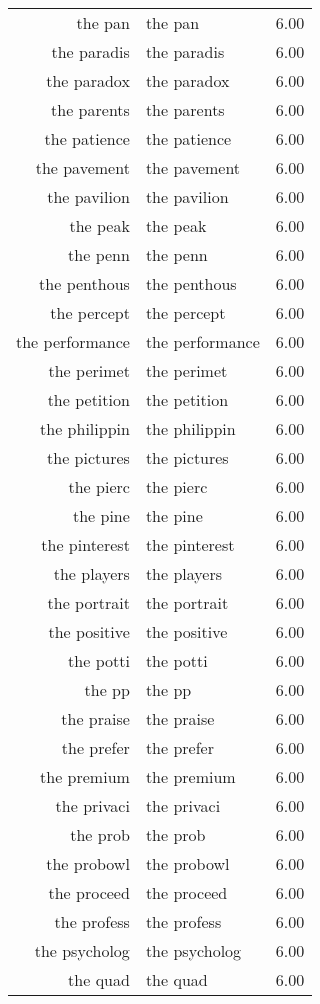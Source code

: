 \begin{table}[ht]
\begin{tabular}{rlr}
  the pan & the pan & 6.00 \\ 
  the paradis & the paradis & 6.00 \\ 
  the paradox & the paradox & 6.00 \\ 
  the parents & the parents & 6.00 \\ 
  the patience & the patience & 6.00 \\ 
  the pavement & the pavement & 6.00 \\ 
  the pavilion & the pavilion & 6.00 \\ 
  the peak & the peak & 6.00 \\ 
  the penn & the penn & 6.00 \\ 
  the penthous & the penthous & 6.00 \\ 
  the percept & the percept & 6.00 \\ 
  the performance & the performance & 6.00 \\ 
  the perimet & the perimet & 6.00 \\ 
  the petition & the petition & 6.00 \\ 
  the philippin & the philippin & 6.00 \\ 
  the pictures & the pictures & 6.00 \\ 
  the pierc & the pierc & 6.00 \\ 
  the pine & the pine & 6.00 \\ 
  the pinterest & the pinterest & 6.00 \\ 
  the players & the players & 6.00 \\ 
  the portrait & the portrait & 6.00 \\ 
  the positive & the positive & 6.00 \\ 
  the potti & the potti & 6.00 \\ 
  the pp & the pp & 6.00 \\ 
  the praise & the praise & 6.00 \\ 
  the prefer & the prefer & 6.00 \\ 
  the premium & the premium & 6.00 \\ 
  the privaci & the privaci & 6.00 \\ 
  the prob & the prob & 6.00 \\ 
  the probowl & the probowl & 6.00 \\ 
  the proceed & the proceed & 6.00 \\ 
  the profess & the profess & 6.00 \\ 
  the psycholog & the psycholog & 6.00 \\ 
  the quad & the quad & 6.00 \\ 

\end{tabular}
\end{table}
